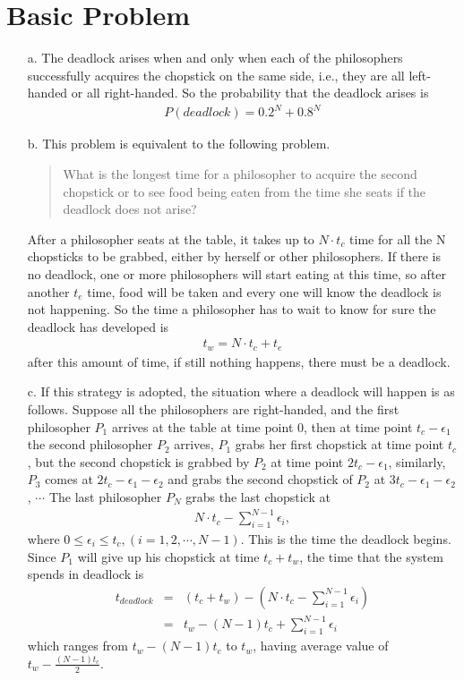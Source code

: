 \documentclass[12pt,letterpaper]{article}
\begin{document}
\section*{Basic Problem}
\begin{itemize}
\item[a.] The deadlock arises when and only when each of the philosophers successfully acquires the chopstick on the same side, i.e., they are all left-handed or all right-handed. So the probability that the deadlock arises is
\begin{align}
P(deadlock) = 0.2^N + 0.8^N
\end{align}
\item[b.] This problem is equivalent to the following problem.
\begin{quote}
What is the longest time for a philosopher to acquire the second chopstick or to see food being eaten from the time she seats if the deadlock does not arise?
\end{quote}
After a philosopher seats at the table, it takes up to $N\cdot t_c$ time for all the N chopsticks to be grabbed, either by herself or other philosophers. If there is no deadlock, one or more philosophers will start eating at this time, so after another $t_e$ time, food will be taken and every one will know the deadlock is not happening. So the time a philosopher has to wait to know for sure the deadlock has developed is
\begin{align}
t_w = N\cdot t_c+t_e
\end{align}
after this amount of time, if still nothing happens, there must be a deadlock.
\item[c.] If this strategy is adopted, the situation where a deadlock will happen is as follows. Suppose all the philosophers are right-handed, and the first philosopher $P_1$ arrives at the table at time point 0, then at time point $t_c-\epsilon_1$ the second philosopher $P_2$ arrives, $P_1$ grabs her first chopstick at time point $t_c$, but the second chopstick is grabbed by $P_2$ at time point $2t_c-\epsilon_1$, similarly, $P_3$ comes at $2t_c-\epsilon_1-\epsilon_2$ and grabs the second chopstick of $P_2$ at $3t_c-\epsilon_1-\epsilon_2$, $\cdots$ The last philosopher $P_N$ grabs the last chopstick at 
\begin{align}
N\cdot t_c-\sum^{N-1}_{i=1}\epsilon_i, 
\end{align}
where $0\le\epsilon_i\le t_c, (i = 1, 2, \cdots, N-1)$. This is the time the deadlock begins. Since $P_1$ will give up his chopstick at time $t_c+t_w$, the time that the system spends in deadlock is
\begin{align}
\nonumber t_{deadlock} & = & (t_c+t_w)-(N\cdot t_c-\sum^{N-1}_{i=1}\epsilon_i)\\
& = & t_w - (N-1)t_c + \sum^{N-1}_{i=1}\epsilon_i
\end{align}
which ranges from $t_w-(N-1)t_c$ to $t_w$, having average value of $t_w-\frac{(N-1)t_c}{2}$.


\end{itemize}
\end{document}
